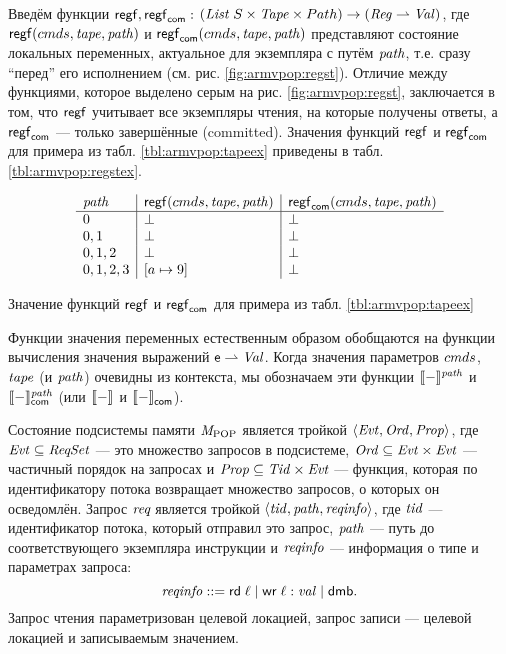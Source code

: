 Введём функции $\mathsf{regf}, \mathsf{regf}_\mathsf{com}:$
$(\mathit{List}\;{S} \times \mathit{Tape} \times Path) \rightarrow (\mathit{Reg} \rightharpoonup \mathit{Val})$,
где $\mathsf{regf}({cmds},\mathit{tape},\mathit{path})$ и $\mathsf{regf}_\mathsf{com}({cmds},\mathit{tape},\mathit{path})$
представляют состояние локальных переменных, актуальное для экземпляра с путём $\mathit{path}$,
т.е. сразу ``перед'' его исполнением (см. рис. \ref{fig:armvpop:regst}).
Отличие между функциями, которое выделено серым на рис. \ref{fig:armvpop:regst},
заключается в том, что $\mathsf{regf}$ учитывает все экземпляры чтения,
на которые получены ответы, а $\mathsf{regf}_\mathsf{com}$ --- только завершённые (committed).
Значения функций $\mathsf{regf}$ и $\mathsf{regf}_\mathsf{com}$ для примера из табл. \ref{tbl:armvpop:tapeex}
приведены в табл. \ref{tbl:armvpop:regstex}.

\begin{table}
\[
\begin{array}{l | l | l}
\mathit{path} & \mathsf{regf}({cmds}, \mathit{tape}, \mathit{path}) & \mathsf{regf}_\mathsf{com}({cmds}, \mathit{tape}, \mathit{path})\\
\hline
 0       & \bot & \bot \\
 0,1     & \bot & \bot \\
 0,1,2   & \bot & \bot  \\
 0,1,2,3 & [a \mapsto 9] & \bot \\
\end{array}
\]
  \caption{Значение функций $\mathsf{regf}$ и $\mathsf{regf}_\mathsf{com}$ для примера из табл. \ref{tbl:armvpop:tapeex}}
  \label{tbl:armvpop:regstex}
\end{table}

Функции значения переменных естественным образом обобщаются на функции вычисления
значения выражений $\mathsf{e} \rightharpoonup \mathit{Val}$.
Когда значения параметров ${cmds}$, $\mathit{tape}$ (и $\mathit{path}$) очевидны из контекста,
мы обозначаем эти функции $\llbracket-\rrbracket ^{\mathit{path}}$ и $\llbracket-\rrbracket ^{\mathit{path}}_\mathsf{com}$
(или $\llbracket-\rrbracket ^{}$ и $\llbracket-\rrbracket ^{}_\mathsf{com}$).

Состояние подсистемы памяти $\mathit{M}_{\mathrm{POP}}$ является тройкой $\langle  \mathit{Evt}, \mathit{Ord}, \mathit{Prop}  \rangle$, где
$\mathit{Evt} \subseteq \mathit{ReqSet}$ --- это множество запросов в подсистеме,
$\mathit{Ord} \subseteq \mathit{Evt} \times \mathit{Evt}$ --- частичный порядок на запросах и
$\mathit{Prop} \subseteq  \mathit{Tid} \times \mathit{Evt}$ --- функция, которая по идентификатору потока возвращает
множество запросов, о которых он осведомлён.
Запрос $\textit{req}$ является тройкой $\langle \mathit{tid}, \mathit{path}, \mathit{reqinfo} \rangle$, где
$\mathit{tid}$ --- идентификатор потока, который отправил это запрос,
$\mathit{path}$ --- путь до соответствующего экземпляра инструкции и
$\mathit{reqinfo}$ --- информация о типе и параметрах запроса:
\[ \mathit{reqinfo} ::= {\sf rd} \; \ell \mid {\sf wr} \; \ell:\mathit{val} \mid {\sf dmb}.\]
Запрос чтения параметризован целевой локацией, запрос записи --- целевой
локацией и записываемым значением.

